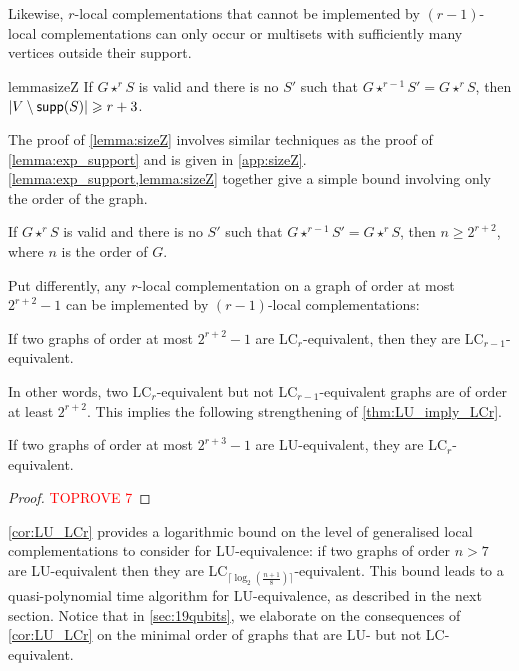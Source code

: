 \documentclass[a4paper,UKenglish,cleveref,autoref,thm-restate]{arxiv}
\newcommand{\gs}{\geqslant}
\newcommand{\sm}{\setminus}
\newcommand{\supp}{\textup{\textsf{supp}}}
\begin{document}
Likewise, $r$-local complementations that cannot be implemented by $(r-1)$-local complementations can only occur or multisets with sufficiently many vertices outside their support.

\begin{restatable}{lemma}{sizeZ}\label{lemma:sizeZ}
    If $G\star^r S$ is valid and there is no $S'$ such that $G\star^{r-1} S' = G \star^r S$, then $|V\sm\supp(S)| \gs r+3$.
\end{restatable}

The proof of \cref{lemma:sizeZ} involves similar techniques as the proof of \cref{lemma:exp_support} and is given in \cref{app:sizeZ}. \cref{lemma:exp_support,lemma:sizeZ} together give a simple bound involving only the order of the graph.

\begin{proposition} \label{prop:boundlevel}
    If $G\star^r S$ is valid and there is no $S'$ such that $G\star^{r-1} S' = G \star^r S$, then $n \gs 2^{r+2}$, where $n$ is the order of $G$.
\end{proposition}

Put differently, any $r$-local complementation on a graph of order at most $2^{r+2}-1$ can be implemented by $(r-1)$-local complementations:

\begin{corollary} \label{cor:LCr_LCr-1}
    If two graphs of order at most $2^{r+2}-1$ are LC$_r$-equivalent, then they are LC$_{r-1}$-equivalent.
\end{corollary}

In other words, two LC$_r$-equivalent but not LC$_{r-1}$-equivalent graphs are of order at least $2^{r+2}$. This implies the following strengthening of \cref{thm:LU_imply_LCr}.

\begin{corollary} \label{cor:LU_LCr}
    If two graphs of order at most $2^{r+3}-1$ are LU-equivalent, they are LC$_r$-equivalent. 
\end{corollary}

\begin{proof}\textcolor{red}{TOPROVE 7}\end{proof}

\cref{cor:LU_LCr} provides a logarithmic bound on the level of generalised local complementations to consider for LU-equivalence: if two graphs of order $n>7$ are LU-equivalent then they are LC$_{\lceil \log_2(\frac{n+1}8)\rceil}$-equivalent. This bound leads to a quasi-polynomial time algorithm for LU-equivalence, as described in the next section. Notice that in \cref{sec:19qubits}, we elaborate on the consequences of \cref{cor:LU_LCr} on the minimal order of graphs that are LU- but not LC-equivalent. 
\end{document}
